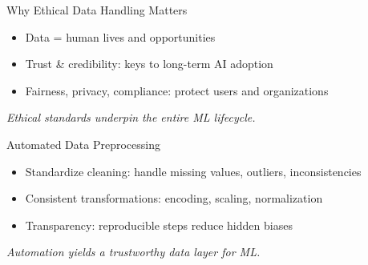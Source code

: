 \documentclass[aspectratio=169]{beamer}
\begin{document}
\begin{frame}{Why Ethical Data Handling Matters}
\begin{itemize}
\item Data = human lives and opportunities
\item Trust \& credibility: keys to long-term AI adoption
\item Fairness, privacy, compliance: protect users and organizations
\end{itemize}

\emph{Ethical standards underpin the entire ML lifecycle.}
\end{frame}


\begin{frame}{Automated Data Preprocessing}
\begin{itemize}
\item Standardize cleaning: handle missing values, outliers, inconsistencies
\item Consistent transformations: encoding, scaling, normalization
\item Transparency: reproducible steps reduce hidden biases
\end{itemize}

\emph{Automation yields a trustworthy data layer for ML.}
\end{frame}

\end{document}

